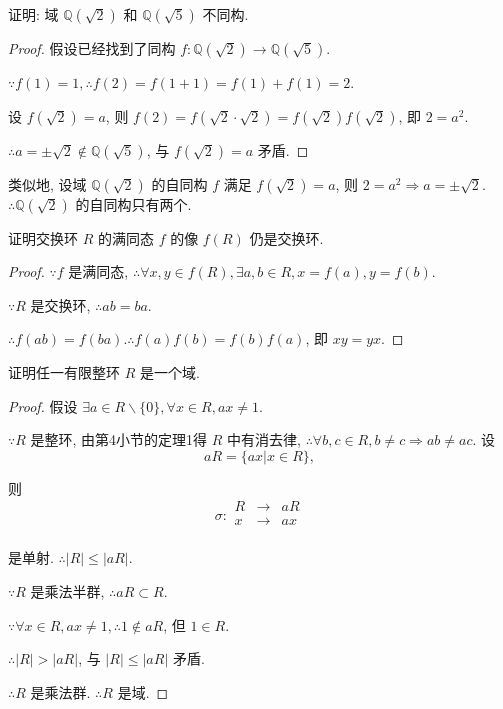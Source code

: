 \documentclass{ctexart}
\begin{document}
\begin{exercise}[3.3]
    证明: 域 $\mathbb{Q}(\sqrt{2})$ 和 $\mathbb{Q}(\sqrt{5})$ 不同构.
\end{exercise}
\begin{proof}
    假设已经找到了同构 $f:\mathbb{Q}(\sqrt{2})\to\mathbb{Q}(\sqrt{5})$.

    $\because f(1)=1,\therefore f(2)=f(1+1)=f(1)+f(1)=2$.

    设 $f(\sqrt{2})=a$, 则 $f(2)=f(\sqrt{2}\cdot\sqrt{2})=f(\sqrt{2})f(\sqrt{2})$, 即 $2=a^2$.

    $\therefore a=\pm\sqrt{2}\notin\mathbb{Q}(\sqrt{5})$, 与 $f(\sqrt{2})=a$ 矛盾.
\end{proof}
\begin{note}
    类似地, 设域 $\mathbb{Q}(\sqrt{2})$ 的自同构 $f$ 满足 $f(\sqrt{2})=a$, 则 $2=a^2\Rightarrow a=\pm\sqrt{2}$. $\therefore\mathbb{Q}(\sqrt{2})$ 的自同构只有两个.
\end{note}
\begin{exercise}[3.4]
    证明交换环 $R$ 的满同态 $f$ 的像 $f(R)$ 仍是交换环.
\end{exercise}
\begin{proof}
    $\because f$ 是满同态, $\therefore\forall x,y\in f(R),\exists a,b\in R,x=f(a),y=f(b)$.

    $\because R$ 是交换环, $\therefore ab=ba$.

    $\therefore f(ab)=f(ba).\therefore f(a)f(b)=f(b)f(a)$, 即 $xy=yx$.
\end{proof}
\begin{exercise}[3.5]\label{ex3.5}
    证明任一有限整环 $R$ 是一个域.
\end{exercise}
\begin{proof}
    假设 $\exists a\in R\backslash\{0\},\forall x\in R,ax\neq1$.

    $\because R$ 是整环, 由第4小节的定理1得 $R$ 中有消去律, $\therefore\forall b,c\in R,b\neq c\Rightarrow ab\neq ac$. 设
    \[aR=\{ax|x\in R\},\]

    则
    \[\sigma:\begin{array}{rcl}
        R & \to & aR \\
        x & \to & ax \\
    \end{array}\]

    是单射. $\therefore|R|\leq|aR|$.

    $\because R$ 是乘法半群, $\therefore aR\subset R$.

    $\because\forall x\in R,ax\neq1,\therefore1\notin aR$, 但 $1\in R$.

    $\therefore|R|>|aR|$, 与 $|R|\leq|aR|$ 矛盾.

    $\therefore R$ 是乘法群. $\therefore R$ 是域.
\end{proof}
\end{document}
